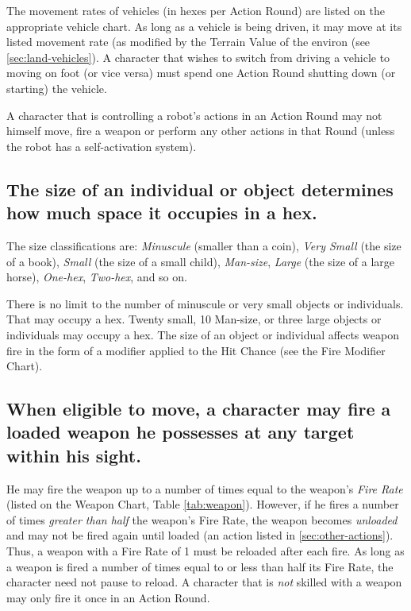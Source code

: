 The movement rates of vehicles (in hexes per Action Round) are listed
on the appropriate vehicle chart. As long as a vehicle is being
driven, it may move at its listed movement rate (as modified by the
Terrain Value of the environ (see \ref{sec:land-vehicles}). A
character that wishes to switch from driving a vehicle to moving on
foot (or vice versa) must spend one Action Round shutting down (or
starting) the vehicle.

A character that is controlling a robot's actions in an Action Round
may not himself move, fire a weapon or perform any other actions in
that Round (unless the robot has a self-activation system).



\subsection[Sizes Of Individuals]{The size of an individual or object
  determines how much space it occupies in a hex.} 
\label{sec:sizes-of-individuals}

The size classifications are: \emph{Minuscule} (smaller than a coin),
\emph{Very Small} (the size of a book), \emph{Small} (the size of a
small child), \emph{Man-size}, \emph{Large} (the size of a large
horse), \emph{One-hex}, \emph{Two-hex}, and so on.

There is no limit to the number of minuscule or very small objects or
individuals. That may occupy a hex. Twenty small, 10 Man-size, or
three large objects or individuals may occupy a hex. The size of an
object or individual affects weapon fire in the form of a modifier
applied to the Hit Chance (see the Fire Modifier Chart).


\subsection[Firing Weapons]{When eligible to move, a character may
  fire a loaded 
  weapon he possesses at any target within his sight.}
\label{sec:firing-weapons}

He may fire the weapon up to a number of times equal to the weapon's
\emph{Fire Rate} (listed on the Weapon Chart, Table
\vref{tab:weapon}). However, if he fires a number of times
\emph{greater than half} the weapon's Fire Rate, the weapon becomes
\emph{unloaded} and may not be fired again until loaded (an action
listed in \ref{sec:other-actions}). Thus, a weapon with a Fire Rate of
1 must be reloaded after each fire. As long as a weapon is fired a
number of times equal to or less than half its Fire Rate, the
character need not pause to reload. A character that is \emph{not}
skilled with a weapon may only fire it once in an Action Round.

